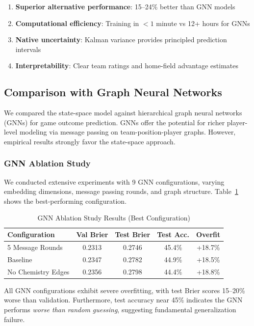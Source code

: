 \begin{enumerate}
    \item \textbf{Superior alternative performance}: 15--24\% better than GNN models
    \item \textbf{Computational efficiency}: Training in $<1$ minute vs 12+ hours for GNNs
    \item \textbf{Native uncertainty}: Kalman variance provides principled prediction intervals
    \item \textbf{Interpretability}: Clear team ratings and home-field advantage estimates
\end{enumerate}

\subsection{Comparison with Graph Neural Networks}

We compared the state-space model against hierarchical graph neural networks (GNNs) for game outcome prediction. GNNs offer the potential for richer player-level modeling via message passing on team-position-player graphs. However, empirical results strongly favor the state-space approach.

\subsubsection{GNN Ablation Study}

We conducted extensive experiments with 9 GNN configurations, varying embedding dimensions, message passing rounds, and graph structure. Table~\ref{tab:gnn-ablation-results} shows the best-performing configuration.

\begin{table}[h]
\centering
\caption{GNN Ablation Study Results (Best Configuration)}
\label{tab:gnn-ablation-results}
\begin{tabular}{lcccc}
\toprule
\textbf{Configuration} & \textbf{Val Brier} & \textbf{Test Brier} & \textbf{Test Acc.} & \textbf{Overfit} \\
\midrule
5 Message Rounds & 0.2313 & 0.2746 & 45.4\% & +18.7\% \\
Baseline & 0.2347 & 0.2782 & 44.9\% & +18.5\% \\
No Chemistry Edges & 0.2356 & 0.2798 & 44.4\% & +18.8\% \\
\bottomrule
\end{tabular}
\end{table}

All GNN configurations exhibit severe overfitting, with test Brier scores 15--20\% worse than validation. Furthermore, test accuracy near 45\% indicates the GNN performs \textit{worse than random guessing}, suggesting fundamental generalization failure.

